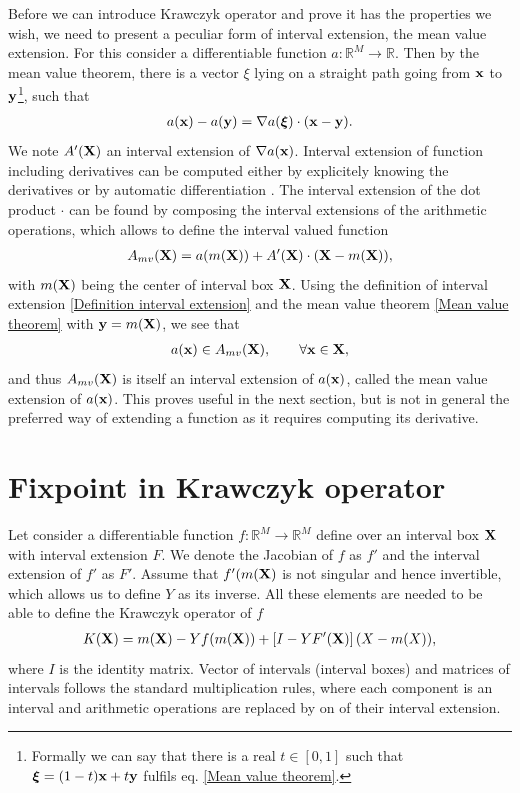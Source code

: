 \documentclass[
11pt, %
american, %
singlespacing, %
final, %
nolistspacing, %
liststotoc, %
headsepline, %
]{MastersDoctoralThesis} %
\begin{document}
Before we can introduce Krawczyk operator and prove it has the properties we wish, we need to present a peculiar form of interval extension, the mean value extension. For this consider a differentiable function $a : \mathbb{R}^M \rightarrow \mathbb{R}$. Then by the mean value theorem, there is a vector $\xi$ lying on a straight path going from $\boldsymbol{\mathrm{x}}$ to $\boldsymbol{\mathrm{y}}$\footnote{Formally we can say that there is a real $t \in [0, 1]$ such that $\boldsymbol{\mathrm{\xi}} = (1 - t)\boldsymbol{\mathrm{x}} + t \boldsymbol{\mathrm{y}}$ fulfils eq. \eqref{Mean value theorem}.}, such that
\begin{align}
	a(\boldsymbol{\mathrm{x}}) - a(\boldsymbol{\mathrm{y}}) = \nabla a(\boldsymbol{\mathrm{\xi}}) \cdot (\boldsymbol{\mathrm{x}} - \boldsymbol{\mathrm{y}}). \label{Mean value theorem}
\end{align}
We note $A'(\boldsymbol{\mathrm{X}})$ an interval extension of $\nabla a(\boldsymbol{\mathrm{x}})$. Interval extension of function including derivatives can be computed either by explicitely knowing the derivatives or by automatic differentiation \cite{fike2012automatic}. The interval extension of the dot product $\cdot$ can be found by composing the interval extensions of the arithmetic operations, which allows to define the interval valued function
\begin{align}
	A_{mv}(\boldsymbol{\mathrm{X}}) = a(m(\boldsymbol{\mathrm{X}})) + A'(\boldsymbol{\mathrm{X}}) \cdot (\boldsymbol{\mathrm{X}} - m(\boldsymbol{\mathrm{X}})), \label{Mean value extension}
\end{align}
with $m(\boldsymbol{\mathrm{X}})$ being the center of interval box $\boldsymbol{\mathrm{X}}$. Using the definition of interval extension \eqref{Definition interval extension} and the mean value theorem \eqref{Mean value theorem} with $\boldsymbol{\mathrm{y}} = m(\boldsymbol{\mathrm{X}})$, we see that
\begin{align}
	a(\boldsymbol{\mathrm{x}}) \in A_{mv}(\boldsymbol{\mathrm{X}}), \qquad \forall \boldsymbol{\mathrm{x}} \in \boldsymbol{\mathrm{X}},
\end{align}
and thus $A_{mv}(\boldsymbol{\mathrm{X}})$ is itself an interval extension of $a(\boldsymbol{\mathrm{x}})$, called the mean value extension of $a(\boldsymbol{\mathrm{x}})$. This proves useful in the next section, but is not in general the preferred way of extending a function as it requires computing its derivative.

\section{Fixpoint in Krawczyk operator}

Let consider a differentiable function $f : \mathbb{R}^M \rightarrow \mathbb{R}^M$ define over an interval box $\boldsymbol{\mathrm{X}}$ with interval extension $F$. We denote the Jacobian of $f$ as $f'$ and the interval extension of $f'$ as $F'$. Assume that $f'(m(\boldsymbol{\mathrm{X}})$ is not singular and hence invertible, which allows us to define $Y$ as its inverse. All these elements are needed to be able to define the Krawczyk operator of $f$
\begin{align}
	K(\boldsymbol{\mathrm{X}}) = m(\boldsymbol{\mathrm{X}}) - Y f(m(\boldsymbol{\mathrm{X}})) + \left[I - Y F'(\boldsymbol{\mathrm{X}})\right] (X - m(X)), \label{Krawczyk operator}
\end{align}
where $I$ is the identity matrix. Vector of intervals (interval boxes) and matrices of intervals follows the standard multiplication rules, where each component is an interval and arithmetic operations are replaced by on of their interval extension.
\end{document}
